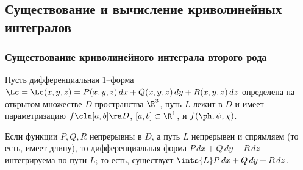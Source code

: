 \documentclass[a4paper]{article}
\begin{document}
\subsection{Существование и вычисление криволинейных интегралов}
\subsubsection{Существование криволинейного интеграла второго рода}

Пусть дифференциальная 1--форма
$\Lc=\Lc(x,y,z)=P(x,y,z)\,dx+Q(x,y,z)\,dy+R(x,y,z)\,dz$ определена
на открытом множестве $D$ пространства $\R^3$, путь $L$ лежит в $D$
и имеет параметризацию $f\cln[a,b]\ra D$, $[a,b]\subset\R^1$, и
$f(\ph,\psi,\chi)$.

\begin{theorem}
\label{thm311} Если функции $P,Q,R$ непрерывны в $D$, а путь $L$
непрерывен и спрямляем (то есть, имеет длину), то дифференциальная
форма $P\,dx+Q\,dy+R\,dz$ интегрируема по пути $L$; то есть,
существует $\ints{L}P\,dx+Q\,dy+R\,dz$.
\end{theorem}
\end{document}
